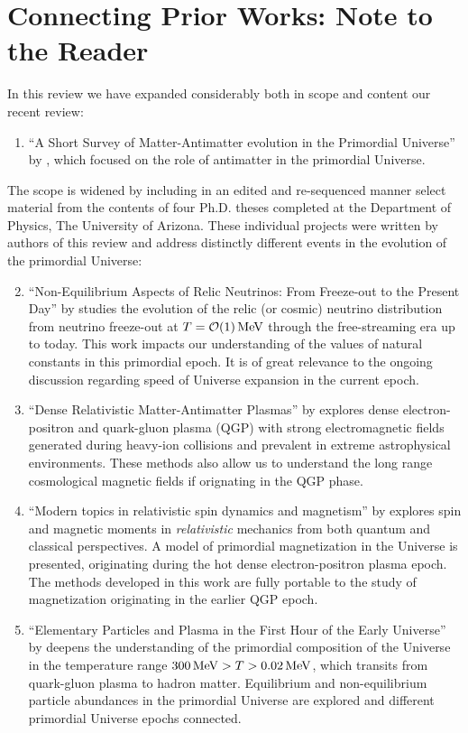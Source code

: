 \section{Connecting Prior Works: Note to the Reader}\label{list:Works}
In this review we have expanded considerably both in scope and content our recent review:
\begin{enumerate}
\item ``A Short Survey of Matter-Antimatter evolution in the Primordial Universe'' by , which focused on the role of antimatter in the primordial Universe. 
\end{enumerate}
The scope is widened by including in an edited and re-sequenced manner select material from the contents of four Ph.D. theses completed at the Department of Physics, The University of Arizona. {\color{black} These individual projects were written by authors of this review and address distinctly different events in the evolution of the primordial Universe:}
\begin{enumerate}
\setcounter{enumi}{1}
\item ``Non-Equilibrium Aspects of Relic Neutrinos: From Freeze-out to the Present Day'' by  studies the evolution of the relic (or cosmic) neutrino distribution from neutrino freeze-out at $T=\mathcal{O}(1)\text{\,MeV}$ through the free-streaming era up to today. {\color{black} This work impacts our understanding of the values of natural constants in this primordial epoch. It is of great relevance to the ongoing discussion regarding speed of Universe expansion in the current epoch.}
%
\item ``Dense Relativistic Matter-Antimatter Plasmas'' by  explores dense electron-positron and quark-gluon plasma (QGP) with strong electromagnetic fields generated during heavy-ion collisions and prevalent in extreme astrophysical environments. {\color{black} These methods also allow us to understand the long range cosmological magnetic fields if orignating in the QGP phase.}
%
\item ``Modern topics in relativistic spin dynamics and magnetism'' by  explores spin and magnetic moments in \emph{relativistic} mechanics from both
quantum and classical perspectives. A model of primordial magnetization in the Universe is presented, originating during the hot dense electron-positron plasma epoch. {\color{black} The methods developed in this work are fully portable to the study of magnetization originating in the earlier QGP epoch.}
%
\item ``Elementary Particles and Plasma in the First Hour of the Early Universe'' by  deepens the understanding of the primordial composition of the Universe in the temperature range $300 \text{\,MeV}>T>0.02\text{\,MeV}$, which transits from quark-gluon plasma to hadron matter. {\color{black} Equilibrium and non-equilibrium particle abundances in the primordial Universe are explored and different primordial Universe epochs connected.}
\end{enumerate}

